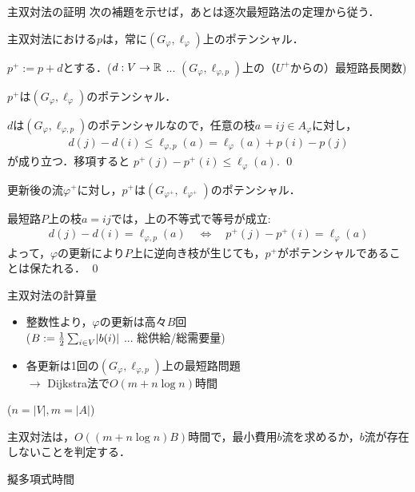 \documentclass[14pt,aspectratio=169,xcolor=dvipsnames,table,onlytextwidth,dvipdfmx]{beamer}
\begin{document}
\begin{frame}{主双対法の証明}
    \small
    次の補題を示せば，あとは逐次最短路法の定理から従う．
    
    \begin{lemma}
    主双対法における$p$は，常に$(G_\varphi, \ell_\varphi)$上のポテンシャル．
    \end{lemma}
    \pause
    $p^+ := p + d$とする．{\footnotesize ($d: V \to \mathbb{R}$ ... $(G_\varphi, \ell_{\varphi,p})$上の（$U^+$からの）最短路長関数)}

    \bigskip
     $p^+$は$(G_\varphi, \ell_\varphi)$のポテンシャル．

    {\footnotesize 
    $d$は$(G_\varphi, \ell_{\varphi,p})$のポテンシャルなので，任意の枝$a = ij \in A_\varphi$に対し，
    \begin{align*}
        d(j) - d(i) \leq \ell_{\varphi,p}(a) = \ell_\varphi(a) + p(i) - p(j)
    \end{align*}
    が成り立つ．移項すると $p^+(j) - p^+(i) \leq \ell_\varphi(a)$. \qed
    }

    \pause
    \bigskip
     更新後の流$\varphi^+$に対し，$p^+$は$(G_{\varphi^+}, \ell_{\varphi^+})$のポテンシャル．

    {\footnotesize 
    最短路$P$上の枝$a = ij$では，上の不等式で等号が成立:
    \begin{align*}
        d(j) - d(i) = \ell_{\varphi,p}(a) \quad \iff \quad p^+(j) - p^+(i) = \ell_\varphi(a)
    \end{align*}
    よって，$\varphi$の更新により$P$上に逆向き枝が生じても，$p^+$がポテンシャルであることは保たれる． \qed }
\end{frame}

\begin{frame}{主双対法の計算量}
    
    \begin{itemize}
        \item 整数性より，$\varphi$の更新は高々$B$回 \\ 
        {\footnotesize \hfill ($B := \frac{1}{2} \sum_{i \in V}\lvert b(i)\rvert$ ... 総供給/総需要量) }

        \item 各更新は1回の$(G_\varphi, \ell_{\varphi, p})$上の最短路問題 \\
        \hfill $\longrightarrow$ Dijkstra法で$O(m + n \log n)$時間
    \end{itemize}
    {\footnotesize \hfill ($n = |V|, m = |A|$)}
    
    \vfill
    \begin{theorem}
        主双対法は，$O((m + n\log n)B)$時間で，最小費用$b$流を求めるか，$b$流が存在しないことを判定する．
    \end{theorem}
    \hfill \alert{擬多項式時間}
\end{frame}
\end{document}
